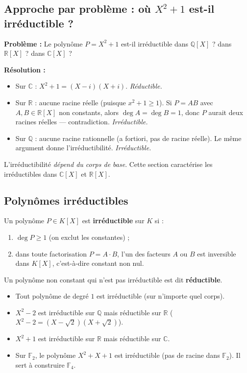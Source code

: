 \subsection{Approche par problème : où $X^2 + 1$ est-il irréductible ?}
\textbf{Problème :} Le polynôme $P = X^2 + 1$ est-il irréductible dans $\mathbb{Q}[X]$ ? dans $\mathbb{R}[X]$ ? dans $\mathbb{C}[X]$ ?

\textbf{Résolution :}
\begin{itemize}
    \item Sur $\mathbb{C}$ : $X^2 + 1 = (X - i)(X + i)$. \emph{Réductible.}
    \item Sur $\mathbb{R}$ : aucune racine réelle (puisque $x^2 + 1 \ge 1$). Si $P = AB$ avec $A, B \in \mathbb{R}[X]$ non constants, alors $\deg A = \deg B = 1$, donc $P$ aurait deux racines réelles --- contradiction. \emph{Irréductible.}
    \item Sur $\mathbb{Q}$ : aucune racine rationnelle (a fortiori, pas de racine réelle). Le même argument donne l'irréductibilité. \emph{Irréductible.}
\end{itemize}

L'irréductibilité \emph{dépend du corps de base}. Cette section caractérise les irréductibles dans $\mathbb{C}[X]$ et $\mathbb{R}[X]$.

\subsection{Polynômes irréductibles}

\begin{definition}
Un polynôme $P \in K[X]$ est \textbf{irréductible} sur $K$ si :
\begin{enumerate}
    \item $\deg P \ge 1$ (on exclut les constantes) ;
    \item dans toute factorisation $P = A \cdot B$, l'un des facteurs $A$ ou $B$ est inversible dans $K[X]$, c'est-à-dire constant non nul.
\end{enumerate}
Un polynôme non constant qui n'est pas irréductible est dit \textbf{réductible}.
\end{definition}

\begin{exemple}
\begin{itemize}
    \item Tout polynôme de degré $1$ est irréductible (sur n'importe quel corps).
    \item $X^2 - 2$ est irréductible sur $\mathbb{Q}$ mais réductible sur $\mathbb{R}$ ($X^2 - 2 = (X - \sqrt{2})(X + \sqrt{2})$).
    \item $X^2 + 1$ est irréductible sur $\mathbb{R}$ mais réductible sur $\mathbb{C}$.
    \item Sur $\mathbb{F}_2$, le polynôme $X^2 + X + 1$ est irréductible (pas de racine dans $\mathbb{F}_2$). Il sert à construire $\mathbb{F}_4$.
\end{itemize}
\end{exemple}

